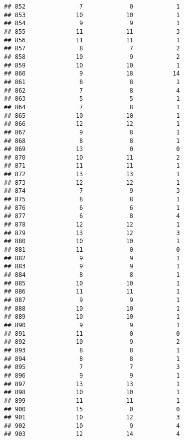 \documentclass[
]{article}
\begin{document}
\begin{verbatim}
## 852               7             0            1
## 853              10            10            1
## 854               9             9            1
## 855              11            11            3
## 856              11            11            1
## 857               8             7            2
## 858              10             9            2
## 859              10            10            1
## 860               9            18           14
## 861               8             8            1
## 862               7             8            4
## 863               5             5            1
## 864               7             8            1
## 865              10            10            1
## 866              12            12            1
## 867               9             8            1
## 868               8             8            1
## 869              13             0            0
## 870              10            11            2
## 871              11            11            1
## 872              13            13            1
## 873              12            12            1
## 874               7             9            3
## 875               8             8            1
## 876               6             6            1
## 877               6             8            4
## 878              12            12            1
## 879              13            12            3
## 880              10            10            1
## 881              11             0            0
## 882               9             9            1
## 883               9             9            1
## 884               8             8            1
## 885              10            10            1
## 886              11            11            1
## 887               9             9            1
## 888              10            10            1
## 889              10            10            1
## 890               9             9            1
## 891              11             0            0
## 892              10             9            2
## 893               8             8            1
## 894               8             8            1
## 895               7             7            3
## 896               9             9            1
## 897              13            13            1
## 898              10            10            1
## 899              11            11            1
## 900              15             0            0
## 901              10            12            3
## 902              10             9            4
## 903              12            14            4

\end{verbatim}
\end{document}
